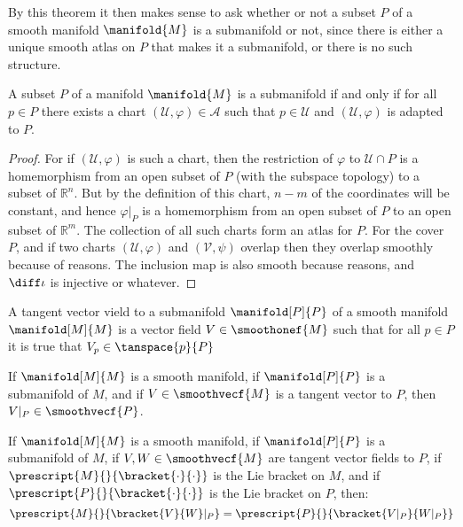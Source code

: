 \documentclass{article}                                                        %
\begin{document}
            By this theorem it then makes sense to ask whether or not a subset
            $P$ of a smooth manifold $\manifold{M}$ is a submanifold or not,
            since there is either a unique smooth atlas on $P$ that makes it a
            submanifold, or there is no such structure.
            \begin{theorem}
                A subset $P$ of a manifold $\manifold{M}$ is a submanifold if
                and only if for all $p\in{P}$ there exists a chart
                $(\mathcal{U},\varphi)\in\mathcal{A}$ such that
                $p\in\mathcal{U}$ and $(\mathcal{U},\varphi)$ is adapted to $P$.
            \end{theorem}
            \begin{proof}
                For if $(\mathcal{U},\varphi)$ is such a chart, then the
                restriction of $\varphi$ to $\mathcal{U}\cap{P}$ is a
                homemorphism from an open subset of $P$ (with the subspace
                topology) to a subset of $\mathbb{R}^{n}$. But by the definition
                of this chart, $n-m$ of the coordinates will be constant, and
                hence $\varphi|_{P}$ is a homemorphism from an open subset of
                $P$ to an open subset of $\mathbb{R}^{m}$. The collection of all
                such charts form an atlas for $P$. For the cover $P$, and if two
                charts $(\mathcal{U},\varphi)$ and $(\mathcal{V},\psi)$ overlap
                then they overlap smoothly because of reasons. The inclusion map
                is also smooth because reasons, and $\diff\iota$ is injective or
                whatever.
            \end{proof}
            \begin{definition}
                A tangent vector vield to a submanifold $\manifold[P]{P}$ of a
                smooth manifold $\manifold[M]{M}$ is a vector field
                $V\in\smoothonef{M}$ such that for all $p\in{P}$ it is true that
                $V_{p}\in\tanspace{p}{P}$
            \end{definition}
            \begin{theorem}
                If $\manifold[M]{M}$ is a smooth manifold, if $\manifold[P]{P}$
                is a submanifold of $M$, and if $V\in\smoothvecf{M}$ is a
                tangent vector to $P$, then $V|_{P}\in\smoothvecf{P}$.
            \end{theorem}
            \begin{theorem}
                If $\manifold[M]{M}$ is a smooth manifold, if $\manifold[P]{P}$
                is a submanifold of $M$, if $V,W\in\smoothvecf{M}$ are tangent
                vector fields to $P$, if
                $\prescript{M}{}{\bracket{\cdot}{\cdot}}$ is the Lie bracket on
                $M$, and if $\prescript{P}{}{\bracket{\cdot}{\cdot}}$ is the Lie
                bracket on $P$, then:
                \begin{equation}
                    \prescript{M}{}{\bracket{V}{W}|_{P}}
                    =\prescript{P}{}{\bracket{V|_{P}}{W|_{P}}}
                \end{equation}
            \end{theorem}
\end{document}
